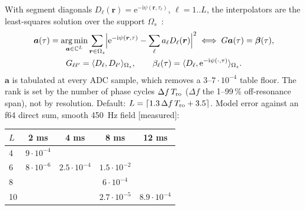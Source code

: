 \documentclass[11pt]{article}
\theoremstyle{remark}
\newcommand{\rr}{\bm r}
\newcommand{\ii}{\mathrm i}
\newcommand{\ee}{\mathrm e}
\newcommand{\CC}{\mathbb C}
\DeclareMathOperator*{\argmin}{arg\,min}
\begin{document}
With segment diagonals $D_\ell(\rr)=\ee^{-\ii\psi(\rr,\tau_\ell)}$, $\ell=1..L$, the interpolators are the least-squares solution over the support $\Omega_s$~\cite{sutton2003}:
\begin{equation}
  \begin{gathered}
  \bm a(\tau)=\argmin_{\bm a\in\CC^L}\sum_{\rr\in\Omega_s}\Bigl|\ee^{-\ii\psi(\rr,\tau)}-\sum_\ell a_\ell D_\ell(\rr)\Bigr|^2
  \iff G\bm a(\tau)=\bm\beta(\tau),\\
  G_{\ell\ell'}=\langle D_\ell,D_{\ell'}\rangle_{\Omega_s},\qquad\beta_\ell(\tau)=\langle D_\ell,\ee^{-\ii\psi(\cdot,\tau)}\rangle_{\Omega_s}.
  \end{gathered}
  \label{eq:lsq}
\end{equation}
$\bm a$ is tabulated at every ADC sample, which removes a $3$--$7\cdot10^{-4}$ table floor. The rank is set by the number of phase cycles $\Delta f\,T_{\rm ro}$ ($\Delta f$ the 1--99\,\% off-resonance span), not by resolution.
Default: $L=\lceil1.3\,\Delta f\,T_{\rm ro}+3.5\rceil$. Model error against an f64 direct sum, smooth 450~Hz field [measured]:
\begin{center}
\begin{tabular}{lcccc}
\toprule
$L$ & 2 ms & 4 ms & 8 ms & 12 ms\\
\midrule
4 & $9\cdot10^{-4}$ & & & \\
6 & $8\cdot10^{-6}$ & $2.5\cdot10^{-4}$ & $1.5\cdot10^{-2}$ & \\
8 & & & $6\cdot10^{-4}$ & \\
10 & & & $2.7\cdot10^{-5}$ & $8.9\cdot10^{-4}$\\
\bottomrule
\end{tabular}
\end{center}
\end{document}
